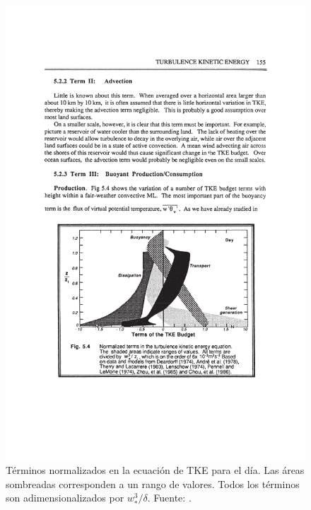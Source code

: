 \begin{figure}[h!]
	\centering
	\includegraphics[width=0.8\linewidth,trim={3cm 6.3cm 2.9cm 11.5cm},clip]{Imagenes/03/tke1}
	\caption{Términos normalizados en la ecuación de TKE para el día. Las áreas sombreadas corresponden a un rango de valores. Todos los términos son adimensionalizados por $w_*^3/\delta$. Fuente: \cite{stull1988introduction}.}
	\label{fig:03_tke1}
\end{figure}

